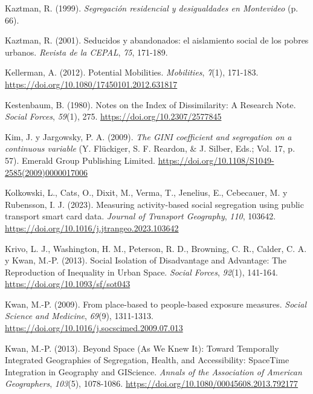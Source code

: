 \documentclass[
  spanish,
  a4paper,%
  chapterprefix=true,%
  DIV=calc,%
  twoside]{scrbook}%
\newlength{\cslhangindent}
\newenvironment{CSLReferences}[2] %
 {\begin{list}{}{%
  \setlength{\itemindent}{0pt}
  \setlength{\leftmargin}{0pt}
  \setlength{\parsep}{0pt}
  \ifodd #1
   \setlength{\leftmargin}{\cslhangindent}
   \setlength{\itemindent}{-1\cslhangindent}
  \fi
  \setlength{\itemsep}{#2\baselineskip}}}
 {\end{list}}
\begin{document}
\begin{CSLReferences}{1}{0}
Kaztman, R. (1999). \emph{Segregación residencial y desigualdades en Montevideo} (p. 66).

Kaztman, R. (2001). Seducidos y abandonados: el aislamiento social de los pobres urbanos. \emph{Revista de la CEPAL}, \emph{75}, 171-189.

Kellerman, A. (2012). Potential Mobilities. \emph{Mobilities}, \emph{7}(1), 171-183. \url{https://doi.org/10.1080/17450101.2012.631817}

Kestenbaum, B. (1980). Notes on the Index of Dissimilarity: A Research Note. \emph{Social Forces}, \emph{59}(1), 275. \url{https://doi.org/10.2307/2577845}

Kim, J. y Jargowsky, P. A. (2009). \emph{The GINI coefficient and segregation on a continuous variable} (Y. Flückiger, S. F. Reardon, \& J. Silber, Eds.; Vol. 17, p. 57). Emerald Group Publishing Limited. \url{https://doi.org/10.1108/S1049-2585(2009)0000017006}

Kolkowski, L., Cats, O., Dixit, M., Verma, T., Jenelius, E., Cebecauer, M. y Rubensson, I. J. (2023). Measuring activity-based social segregation using public transport smart card data. \emph{Journal of Transport Geography}, \emph{110}, 103642. \url{https://doi.org/10.1016/j.jtrangeo.2023.103642}

Krivo, L. J., Washington, H. M., Peterson, R. D., Browning, C. R., Calder, C. A. y Kwan, M.-P. (2013). Social Isolation of Disadvantage and Advantage: The Reproduction of Inequality in Urban Space. \emph{Social Forces}, \emph{92}(1), 141-164. \url{https://doi.org/10.1093/sf/sot043}

Kwan, M.-P. (2009). From place-based to people-based exposure measures. \emph{Social Science and Medicine}, \emph{69}(9), 1311-1313. \url{https://doi.org/10.1016/j.socscimed.2009.07.013}

Kwan, M.-P. (2013). Beyond Space (As We Knew It): Toward Temporally Integrated Geographies of Segregation, Health, and Accessibility: Space{\textendash}Time Integration in Geography and GIScience. \emph{Annals of the Association of American Geographers}, \emph{103}(5), 1078-1086. \url{https://doi.org/10.1080/00045608.2013.792177}


\end{CSLReferences}
\end{document}
